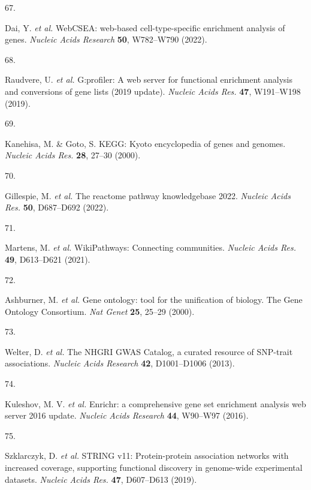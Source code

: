 \documentclass[
  11,
  a4paper,
]{article}
\newlength{\cslhangindent}
\newlength{\csllabelwidth}
\newlength{\cslentryspacingunit} %
\newenvironment{CSLReferences}[2] %
 {%
  \setlength{\parindent}{0pt}
  \ifodd #1
  \let\oldpar\par
  \def\par{\hangindent=\cslhangindent\oldpar}
  \fi
  \setlength{\parskip}{#2\cslentryspacingunit}
 }%
 {}
\newcommand{\CSLLeftMargin}[1]{\parbox[t]{\csllabelwidth}{#1}}
\newcommand{\CSLRightInline}[1]{\parbox[t]{\linewidth - \csllabelwidth}{#1}\break}
\begin{document}
\begin{CSLReferences}{0}{0}
\leavevmode{}%
\CSLLeftMargin{67. }%
\CSLRightInline{Dai, Y. \emph{et al.} {WebCSEA: web-based
cell-type-specific enrichment analysis of genes}. \emph{Nucleic Acids
Research} \textbf{50}, W782--W790 (2022).}

\leavevmode{}%
\CSLLeftMargin{68. }%
\CSLRightInline{Raudvere, U. \emph{et al.} G:profiler: A web server for
functional enrichment analysis and conversions of gene lists (2019
update). \emph{Nucleic Acids Res.} \textbf{47}, W191--W198 (2019).}

\leavevmode{}%
\CSLLeftMargin{69. }%
\CSLRightInline{Kanehisa, M. \& Goto, S. {KEGG}: Kyoto encyclopedia of
genes and genomes. \emph{Nucleic Acids Res.} \textbf{28}, 27--30
(2000).}

\leavevmode{}%
\CSLLeftMargin{70. }%
\CSLRightInline{Gillespie, M. \emph{et al.} The reactome pathway
knowledgebase 2022. \emph{Nucleic Acids Res.} \textbf{50}, D687--D692
(2022).}

\leavevmode{}%
\CSLLeftMargin{71. }%
\CSLRightInline{Martens, M. \emph{et al.} {WikiPathways}: Connecting
communities. \emph{Nucleic Acids Res.} \textbf{49}, D613--D621 (2021).}

\leavevmode{}%
\CSLLeftMargin{72. }%
\CSLRightInline{Ashburner, M. \emph{et al.} {{G}ene ontology: tool for
the unification of biology. {T}he {G}ene {O}ntology {C}onsortium}.
\emph{Nat Genet} \textbf{25}, 25--29 (2000).}

\leavevmode{}%
\CSLLeftMargin{73. }%
\CSLRightInline{Welter, D. \emph{et al.} {The NHGRI GWAS Catalog, a
curated resource of SNP-trait associations}. \emph{Nucleic Acids
Research} \textbf{42}, D1001--D1006 (2013).}

\leavevmode{}%
\CSLLeftMargin{74. }%
\CSLRightInline{Kuleshov, M. V. \emph{et al.} {Enrichr: a comprehensive
gene set enrichment analysis web server 2016 update}. \emph{Nucleic
Acids Research} \textbf{44}, W90--W97 (2016).}

\leavevmode{}%
\CSLLeftMargin{75. }%
\CSLRightInline{Szklarczyk, D. \emph{et al.} {STRING} v11:
Protein-protein association networks with increased coverage, supporting
functional discovery in genome-wide experimental datasets. \emph{Nucleic
Acids Res.} \textbf{47}, D607--D613 (2019).}


\end{CSLReferences}
\end{document}
